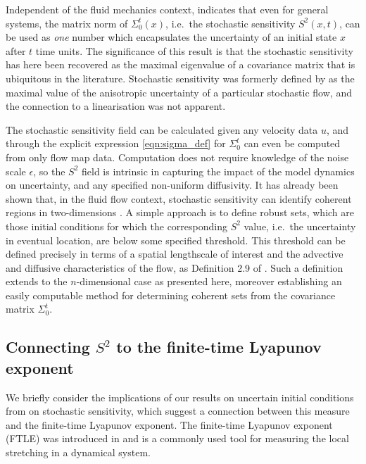 Independent of the fluid mechanics context,  indicates that even for general systems, the matrix norm of \(\Sigma_0^t(x)\), i.e.\ the stochastic sensitivity \(S^2(x,t)\), can be used as {\em one} number which encapsulates the uncertainty of an initial state \(x\) after \(t\) time units.
The significance of this result is that the stochastic sensitivity has here been recovered as the maximal eigenvalue of a covariance matrix that is ubiquitous in the literature.
Stochastic sensitivity was formerly defined by \citet{Balasuriya_2020_StochasticSensitivityComputable} as the maximal value of the anisotropic uncertainty of a particular stochastic flow, and the connection to a linearisation was not apparent.

The stochastic sensitivity field can be calculated given any velocity data \(u\), and through the explicit expression \cref{eqn:sigma_def} for \(\Sigma_0^t\) can even be computed from only flow map data.
Computation does not require knowledge of the noise scale \(\epsilon\), so the \(S^2\) field is intrinsic in capturing the impact of the model dynamics on uncertainty, and any specified non-uniform diffusivity.
It has already been shown that, in the fluid flow context, stochastic sensitivity can identify coherent regions in two-dimensions \citep{BadzaEtAl_2023_HowSensitiveAre, Balasuriya_2020_StochasticSensitivityComputable}.
A simple approach is to define robust sets, which are those initial conditions for which the corresponding \(S^2\) value, i.e.\ the uncertainty in eventual location, are below some specified threshold.
This threshold can be defined precisely in terms of a spatial lengthscale of interest and the advective and diffusive characteristics of the flow, as Definition 2.9 of \citet{Balasuriya_2020_StochasticSensitivityComputable}.
Such a definition extends to the \(n\)-dimensional case as presented here, moreover establishing an easily computable method for determining coherent sets from the covariance matrix \(\Sigma_0^t\).




\subsection{Connecting \(S^2\) to the finite-time Lyapunov exponent}\label{sec:ftle_s2_connection}
We briefly consider the implications of our results on uncertain initial conditions from  on stochastic sensitivity, which suggest a connection between this measure and the finite-time Lyapunov exponent.
The finite-time Lyapunov exponent (FTLE) was introduced in  and is a commonly used tool for measuring the local stretching in a dynamical system.

